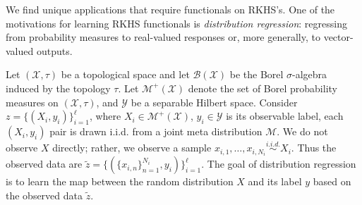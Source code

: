 \documentclass{article}
\def\RR{\mathbb R}
\numberwithin{equation}{section}
\begin{document}
We find unique applications that require functionals on RKHS's.
One of the motivations for learning RKHS functionals is {\it distribution regression}: regressing from probability measures to real-valued responses or, more generally, to vector-valued outputs.  

Let $(\mathcal{X}, \tau)$  be a topological space and let $\mathcal{B}(\mathcal{X})$ be the Borel $\sigma$-algebra induced by
the topology $\tau$. Let $\mathcal{M}^+(\mathcal{X})$ denote the set of Borel probability measures on $(\mathcal{X}, \tau)$, and $\mathcal{Y}$ be a separable Hilbert space. 
Consider $z=\{(X_i, y_i)\}_{i=1}^\ell$, where $X_i\in \mathcal{M}^+(\mathcal{X})$, $y_i\in \mathcal{Y}$ is its observable label, each $(X_i, y_i)$ pair is drawn i.i.d. from a joint meta distribution $\mathcal{M}$.
We do not observe $X$ directly; rather, we observe a sample $x_{i,1}, \ldots, x_{i,N_i} \overset{i.i.d.}{\sim} X_i$.
Thus the observed data are $\tilde z=\{(\{x_{i,n}\}_{n=1}^{N_i}, y_i)\}_{i=1}^\ell$.  The goal of distribution regression is to learn the map between the random distribution $X$ and its label $y$ based on the observed data $\tilde z$. %
\end{document}
